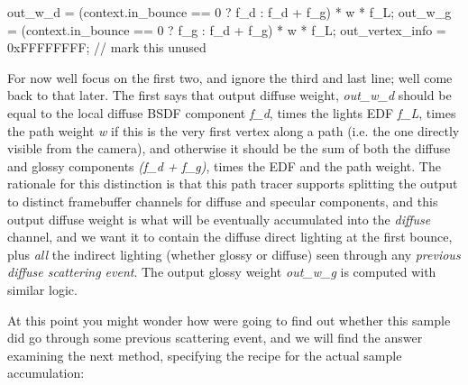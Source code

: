 \begin{DoxyCodeInclude}
        out\_w\_d = (context.in\_bounce == 0 ? f\_d : f\_d + f\_g) * w * f\_L;
        out\_w\_g = (context.in\_bounce == 0 ? f\_g : f\_d + f\_g) * w * f\_L;
        out\_vertex\_info = 0xFFFFFFFF; \textcolor{comment}{// mark this unused}
\end{DoxyCodeInclude}
 \begin{DoxyParagraph}{}
For now we\textquotesingle{}ll focus on the first two, and ignore the third and last line; we\textquotesingle{}ll come back to that later. The first says that output diffuse weight, {\itshape out\+\_\+w\+\_\+d} should be equal to the local diffuse B\+S\+DF component {\itshape f\+\_\+d}, times the light\textquotesingle{}s E\+DF {\itshape f\+\_\+L}, times the path weight {\itshape w} if this is the very first vertex along a path (i.\+e. the one directly visible from the camera), and otherwise it should be the sum of both the diffuse and glossy components {\itshape (f\+\_\+d + f\+\_\+g)}, times the E\+DF and the path weight. The rationale for this distinction is that this path tracer supports splitting the output to distinct framebuffer channels for diffuse and specular components, and this output diffuse weight is what will be eventually accumulated into the {\itshape diffuse} channel, and we want it to contain the diffuse direct lighting at the first bounce, plus {\itshape all} the indirect lighting (whether glossy or diffuse) seen through any {\itshape previous diffuse scattering event}. The output glossy weight {\itshape out\+\_\+w\+\_\+g} is computed with similar logic.
\end{DoxyParagraph}
\begin{DoxyParagraph}{}
At this point you might wonder how we\textquotesingle{}re going to find out whether this sample did go through some previous scattering event, and we will find the answer examining the next method, specifying the recipe for the actual sample accumulation\+:
\end{DoxyParagraph}

